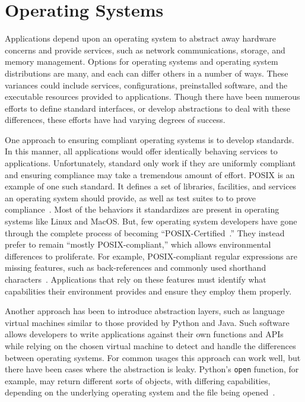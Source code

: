 \section{Operating Systems}
Applications depend upon an operating system to abstract away hardware concerns and provide services, such as network communications,
storage,
and memory management.
Options for operating systems and operating system distributions are many, and each can differ others in a number of ways. These variances could include services,
configurations,
preinstalled software,
and the executable resources provided to applications.
Though there have been numerous efforts to define standard interfaces, or develop abstractions to deal with these differences, these efforts have had varying degrees of success.

One approach to ensuring compliant operating systems is to develop standards. In this manner, all applications would offer identically behaving services to applications. 
Unfortunately, standard only work if they are uniformly compliant and ensuring compliance
may take a tremendous amount of effort.
POSIX is an example of one such standard.
It defines a set of libraries, facilities, and services an operating system should provide, as well as test suites to to prove compliance~\cite{posixoverview}.
Most of the behaviors it standardizes are present in operating systems like Linux and MacOS. But, few operating system developers have gone through the complete process of becoming ``POSIX-Certified~\cite{posixregister}.''
They instead prefer to remain ``mostly POSIX-compliant,'' which allows environmental differences to proliferate. 
For example,
POSIX-compliant regular expressions are missing features, such as back-references and commonly used shorthand characters~\cite{posixregex}.
Applications that rely on these features must identify what capabilities their environment provides and ensure they employ them properly.

Another approach has been to introduce abstraction layers, such as language virtual machines similar to those provided by Python and Java.
Such software allows developers to write applications against their own functions and APIs while relying on the chosen virtual machine to detect and handle the differences between operating systems.
For common usages this approach can work well, but there have been cases where
the abstraction is leaky.
Python's {\tt open} function, for example, may return different sorts of objects,
with differing capabilities,
depending on the underlying operating system and the file being opened~\cite{pythonopen}.

